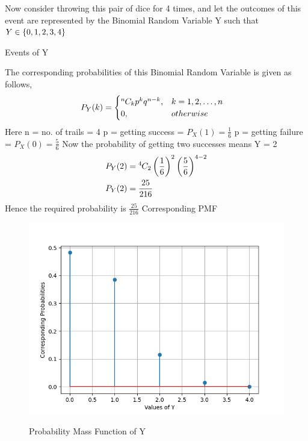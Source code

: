 \documentclass[journal,12pt,twocolumn]{IEEEtran}
\begin{document}
\begin{flushleft}
Now consider throwing this pair of dice for 4 times, and let the outcomes of this event are represented by the Binomial Random Variable Y such that $Y \in \left\{0, 1, 2, 3, 4\right\}$
\begin{table}[h]
	\caption{Events of Y}
	\label{tab:mesh}
	
\end{table}
The corresponding probabilities of this Binomial Random Variable is given as follows,
\begin{align}
	P_Y(k) &= \begin{cases} {{}^{n}\mkern-1muC_{k}} p^k q^{n-k} , & k = 1,2,\dots ,n \\
	0 , & otherwise \end{cases}
\end{align}
Here n = no. of trails = 4 \newline
p = getting success = $P_X(1) = \frac{1}{6}$ \newline
p = getting failure = $P_X(0) = \frac{5}{6}$ \newline
Now the probability of getting two successes means Y = 2
\begin{align}
	P_Y(2) &= {{}^{4}\mkern-1muC_{2}} \left(\frac{1}{6}\right)^2 \left(\frac{5}{6}\right)^{4-2} \\
	P_Y(2) &= \frac{25}{216}
\end{align}
Hence the required probability is $\frac{25}{216}$ \newline
Corresponding PMF
\begin{figure}[h]
    \centering
	\includegraphics[width = \columnwidth]{plot}
	\label{fig:1}
	\caption{Probability Mass Function of Y}
\end{figure}
\end{flushleft}
\end{document}
